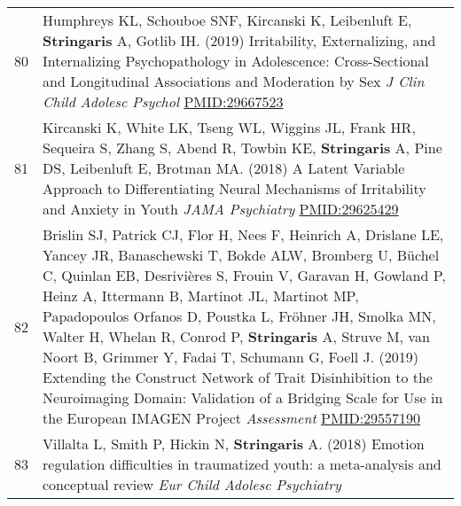 \documentclass[
]{article}
\begin{document}
\begin{longtable}[]{@{}ll@{}}
\begin{minipage}[t]{0.01\columnwidth}\raggedright
80\strut
\end{minipage} & \begin{minipage}[t]{0.94\columnwidth}\raggedright
Humphreys KL, Schouboe SNF, Kircanski K, Leibenluft E,
\textbf{Stringaris} A, Gotlib IH. (2019) Irritability, Externalizing,
and Internalizing Psychopathology in Adolescence: Cross-Sectional and
Longitudinal Associations and Moderation by Sex \emph{J Clin Child
Adolesc Psychol} \url{PMID:29667523}\strut
\end{minipage}\tabularnewline
\begin{minipage}[t]{0.01\columnwidth}\raggedright
81\strut
\end{minipage} & \begin{minipage}[t]{0.94\columnwidth}\raggedright
Kircanski K, White LK, Tseng WL, Wiggins JL, Frank HR, Sequeira S, Zhang
S, Abend R, Towbin KE, \textbf{Stringaris} A, Pine DS, Leibenluft E,
Brotman MA. (2018) A Latent Variable Approach to Differentiating Neural
Mechanisms of Irritability and Anxiety in Youth \emph{JAMA Psychiatry}
\url{PMID:29625429}\strut
\end{minipage}\tabularnewline
\begin{minipage}[t]{0.01\columnwidth}\raggedright
82\strut
\end{minipage} & \begin{minipage}[t]{0.94\columnwidth}\raggedright
Brislin SJ, Patrick CJ, Flor H, Nees F, Heinrich A, Drislane LE, Yancey
JR, Banaschewski T, Bokde ALW, Bromberg U, Büchel C, Quinlan EB,
Desrivières S, Frouin V, Garavan H, Gowland P, Heinz A, Ittermann B,
Martinot JL, Martinot MP, Papadopoulos Orfanos D, Poustka L, Fröhner JH,
Smolka MN, Walter H, Whelan R, Conrod P, \textbf{Stringaris} A, Struve
M, van Noort B, Grimmer Y, Fadai T, Schumann G, Foell J. (2019)
Extending the Construct Network of Trait Disinhibition to the
Neuroimaging Domain: Validation of a Bridging Scale for Use in the
European IMAGEN Project \emph{Assessment} \url{PMID:29557190}\strut
\end{minipage}\tabularnewline
\begin{minipage}[t]{0.01\columnwidth}\raggedright
83\strut
\end{minipage} & \begin{minipage}[t]{0.94\columnwidth}\raggedright
Villalta L, Smith P, Hickin N, \textbf{Stringaris} A. (2018) Emotion
regulation difficulties in traumatized youth: a meta-analysis and
conceptual review \emph{Eur Child Adolesc Psychiatry}

\end{minipage}
\end{longtable}
\end{document}
